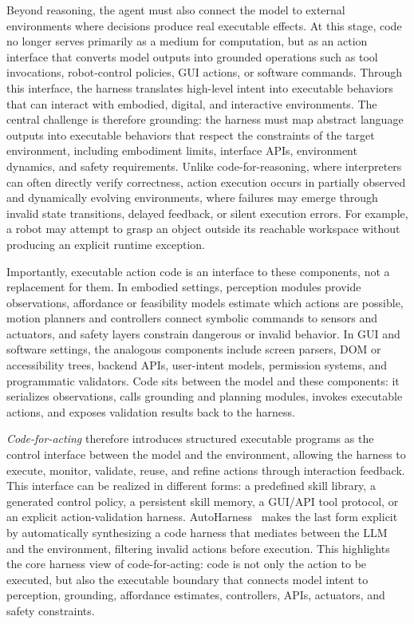 \documentclass{llmxive}
\begin{document}
Beyond reasoning, the agent must also connect the model to external environments where decisions produce real executable effects. At this stage, code no longer serves primarily as a medium for
computation, but as an action interface that converts model outputs into grounded operations such as tool invocations, robot-control policies, GUI actions, or software commands.
Through this interface, the harness translates high-level intent into executable behaviors that can interact with embodied, digital, and interactive environments.
The central challenge is therefore grounding: the harness must map abstract language outputs into executable behaviors that respect the constraints of the target environment, including embodiment limits, interface APIs, environment dynamics, and safety requirements. Unlike code-for-reasoning, where interpreters can often directly verify correctness, action execution occurs in partially observed and dynamically evolving environments, where failures may emerge through invalid state transitions, delayed feedback, or silent execution errors. For example, a robot may attempt to grasp an object outside its reachable workspace without producing an explicit runtime exception.


Importantly, executable action code is an interface to these
components, not a replacement for them. In embodied settings,
perception modules provide observations, affordance or feasibility
models estimate which actions are possible, motion planners and
controllers connect symbolic commands to sensors and actuators,
and safety layers constrain dangerous or invalid behavior. In GUI
and software settings, the analogous components include screen
parsers, DOM or accessibility trees, backend APIs, user-intent
models, permission systems, and programmatic validators. Code sits
between the model and these components: it serializes observations,
calls grounding and planning modules, invokes executable actions,
and exposes validation results back to the harness.

\textit{Code-for-acting} therefore introduces structured
executable programs as the control interface between the model
and the environment, allowing the harness to execute, monitor,
validate, reuse, and refine actions through interaction feedback.
This interface can be realized in different forms: a predefined
skill library, a generated control policy, a persistent skill
memory, a GUI/API tool protocol, or an explicit action-validation
harness. AutoHarness~\cite{lou2026autoharnessimprovingllmagents}
makes the last form explicit by automatically synthesizing a code
harness that mediates between the LLM and the environment,
filtering invalid actions before execution. This highlights the
core harness view of code-for-acting: code is not only the action
to be executed, but also the executable boundary that connects
model intent to perception, grounding, affordance estimates,
controllers, APIs, actuators, and safety constraints.
\end{document}
